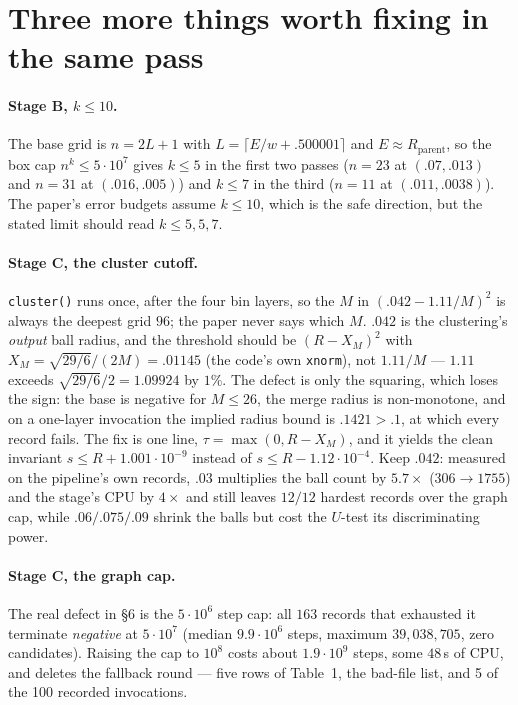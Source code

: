 \documentclass[11pt]{article}
\begin{document}
\section{Three more things worth fixing in the same pass}

\paragraph{Stage B, $k\le10$.} The base grid is $n=2L+1$ with $L=\lceil E/w+.500001\rceil$ and
$E\approx R_{\text{parent}}$, so the box cap $n^k\le5\cdot10^7$ gives $k\le5$ in the first two
passes ($n=23$ at $(.07,.013)$ and $n=31$ at $(.016,.005)$) and $k\le7$ in the third ($n=11$ at
$(.011,.0038)$). The paper's error budgets assume $k\le10$, which is the safe direction, but the
stated limit should read $k\le5,5,7$.

\paragraph{Stage C, the cluster cutoff.} \texttt{cluster()} runs once, after the four bin layers, so
the $M$ in $(.042-1.11/M)^2$ is always the deepest grid $96$; the paper never says which $M$.
$.042$ is the clustering's \emph{output} ball radius, and the threshold should be $(R-X_M)^2$ with
$X_M=\sqrt{29/6}/(2M)=.01145$ (the code's own \texttt{xnorm}), not $1.11/M$ --- $1.11$ exceeds
$\sqrt{29/6}/2=1.09924$ by $1\%$. The defect is only the squaring, which loses the sign: the base is
negative for $M\le26$, the merge radius is non-monotone, and on a one-layer invocation the implied
radius bound is $.1421>.1$, at which every record fails. The fix is one line, $\tau=\max(0,R-X_M)$,
and it yields the clean invariant $s\le R+1.001\cdot10^{-9}$ instead of $s\le R-1.12\cdot10^{-4}$.
Keep $.042$: measured on the pipeline's own records, $.03$ multiplies the ball count by $5.7\times$
($306\to1755$) and the stage's CPU by $4\times$ and still leaves $12/12$ hardest records over the
graph cap, while $.06/.075/.09$ shrink the balls but cost the $U$-test its discriminating power.

\paragraph{Stage C, the graph cap.} The real defect in \S6 is the $5\cdot10^6$ step cap: all $163$
records that exhausted it terminate \emph{negative} at $5\cdot10^7$ (median $9.9\cdot10^6$ steps,
maximum $39{,}038{,}705$, zero candidates). Raising the cap to $10^8$ costs about $1.9\cdot10^9$
steps, some $48$\,s of CPU, and deletes the fallback round --- five rows of Table~1, the bad-file
list, and 5 of the 100 recorded invocations.
\end{document}
